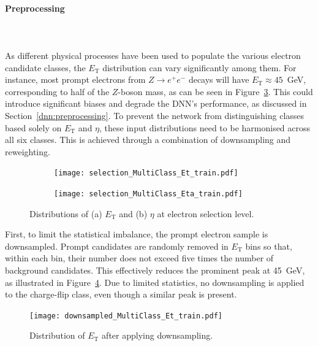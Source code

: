 \paragraph{Preprocessing} \mbox{}\\
\\
As different physical processes have been used to populate the various electron candidate classes, the $E_{\text{T}}$ distribution can vary significantly among them. For instance, most prompt electrons from $Z \to e^{+}e^{-}$ decays will have $E_{\text{T}} \approx 45$~GeV, corresponding to half of the $Z$-boson mass, as can be seen in Figure~\ref{fig:et_eta_selection}. This could introduce significant biases and degrade the DNN’s performance, as discussed in Section~\ref{dnn:preprocessing}.
To prevent the network from distinguishing classes based solely on $E_{\text{T}}$ and $\eta$, these input distributions need to be harmonised across all six classes. This is achieved through a combination of downsampling and reweighting.

\begin{figure}[h]
  \centering
  \begin{subfigure}[b]{0.6\textwidth}
      \centering
      \texttt{[image: selection\_MultiClass\_Et\_train.pdf]}
      \caption{}
      \label{fig:et_selection}
  \end{subfigure}
  \begin{subfigure}[b]{0.6\textwidth}
      \centering
      \texttt{[image: selection\_MultiClass\_Eta\_train.pdf]}
      \caption{}
      \label{fig:eta_selection}
  \end{subfigure}
  \caption{Distributions of (a) $E_{\text{T}}$ and (b) $\eta$ at electron selection level.}
  \label{fig:et_eta_selection}
\end{figure}

First, to limit the statistical imbalance, the prompt electron sample is downsampled. Prompt candidates are randomly removed in $E_{\text{T}}$ bins so that, within each bin, their number does not exceed five times the number of background candidates. This effectively reduces the prominent peak at 45~GeV, as illustrated in Figure~\ref{fig:et_downsampled}. Due to limited statistics, no downsampling is applied to the charge-flip class, even though a similar peak is present.

\begin{figure}[h]
  \centering
  \texttt{[image: downsampled\_MultiClass\_Et\_train.pdf]}
  \caption{Distribution of $E_{\text{T}}$ after applying downsampling.}
  \label{fig:et_downsampled}
\end{figure}

